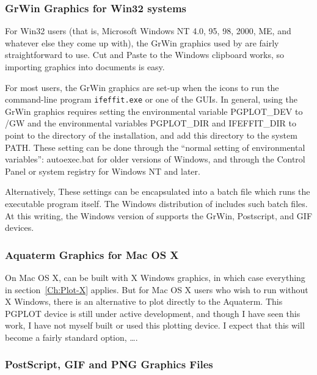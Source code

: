 \subsubsection{GrWin Graphics for Win32 systems} \label{Ch:Plot-Win32}
{}
For Win32 users (that is, Microsoft Windows NT 4.0, 95, 98, 2000, ME,
and whatever else they come up with), the GrWin graphics used by
{\ifeffit} are fairly straightforward to use.  Cut and Paste to the
Windows clipboard works, so importing graphics into documents is easy.

For most users, the GrWin graphics are set-up when the icons to run the
command-line program {\tt{ifeffit.exe}} or one of the GUIs.  In general,
using the GrWin graphics requires setting the environmental variable
PGPLOT\_DEV to /GW and the environmental variables PGPLOT\_DIR and
IFEFFIT\_DIR to point to the directory of the {\ifeffit} installation, and
add this directory to the system PATH.  These setting can be done through
the ``normal setting of environmental variables'': autoexec.bat for older
versions of Windows, and through the Control Panel or system registry for
Windows NT and later.

Alternatively, These settings can be encapsulated into a batch file which
runs the {\ifeffit} executable program itself.  The Windows distribution of
{\ifeffit} includes such batch files.  At this writing, the Windows version
of {\ifeffit} supports the GrWin, Postscript, and GIF devices.

\subsubsection{Aquaterm Graphics for Mac OS X} \label{Ch:Plot-aqt}
{}

On Mac OS X, {\ifeffit} can be built with X Windows graphics, in which case
everything in section~\ref{Ch:Plot-X} applies.  But for Mac OS X users who
wish to run {\ifeffit} without X Windows, there is an alternative to plot
directly to the Aquaterm.  This PGPLOT device is still under active
development, and though I have seen this work, I have not myself built or
used this plotting device.  I expect that this will become a fairly
standard option, \ldots.


\subsubsection{PostScript, GIF and PNG Graphics Files} \label{Ch:Plot-PS}
{}


